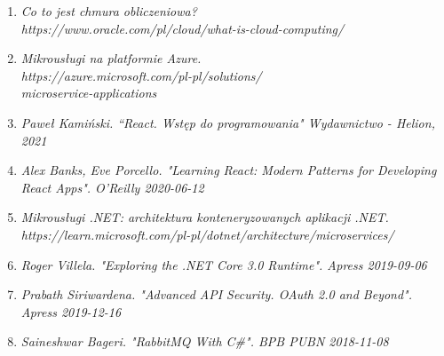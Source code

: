 \begin{enumerate}
\item {\textit {Co to jest chmura obliczeniowa? \\ https://www.oracle.com/pl/cloud/what-is-cloud-computing/}}
\item {\textit {Mikrousługi na platformie Azure. \\ https://azure.microsoft.com/pl-pl/solutions/\\microservice-applications}}
\item {\textit {Paweł Kamiński. “React. Wstęp do programowania" Wydawnictwo - Helion, 2021}}
\item {\textit {Alex Banks, Eve Porcello. "Learning React: Modern Patterns for Developing React Apps". O'Reilly 2020-06-12}}
\item {\textit {Mikrousługi .NET: architektura konteneryzowanych aplikacji .NET. \\ https://learn.microsoft.com/pl-pl/dotnet/architecture/microservices/}}
\item {\textit{Roger Villela. "Exploring the .NET Core 3.0 Runtime". Apress 2019-09-06}}
\item {\textit {Prabath Siriwardena. "Advanced API Security. OAuth 2.0 and Beyond". Apress 2019-12-16}}
\item {\textit {Saineshwar Bageri. "RabbitMQ With C\#". BPB PUBN 2018-11-08}}

\end{enumerate}